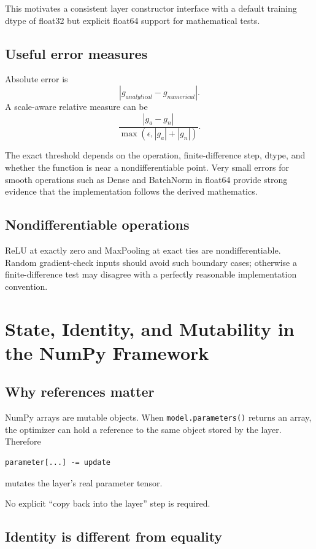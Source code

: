 \documentclass[11pt,a4paper]{article}
\newcommand{\code}[1]{\texttt{#1}}
\begin{document}
This motivates a consistent layer constructor interface with a default training dtype of float32 but explicit float64 support for mathematical tests.

\subsection{Useful error measures}

Absolute error is
\[
|g_{analytical}-g_{numerical}|.
\]
A scale-aware relative measure can be
\[
\frac{|g_a-g_n|}
{\max(\epsilon,|g_a|+|g_n|)}.
\]

The exact threshold depends on the operation, finite-difference step, dtype, and whether the function is near a nondifferentiable point. Very small errors for smooth operations such as Dense and BatchNorm in float64 provide strong evidence that the implementation follows the derived mathematics.

\subsection{Nondifferentiable operations}

ReLU at exactly zero and MaxPooling at exact ties are nondifferentiable. Random gradient-check inputs should avoid such boundary cases; otherwise a finite-difference test may disagree with a perfectly reasonable implementation convention.

\section{State, Identity, and Mutability in the NumPy Framework}

\subsection{Why references matter}

NumPy arrays are mutable objects. When \code{model.parameters()} returns an array, the optimizer can hold a reference to the same object stored by the layer. Therefore
\begin{lstlisting}
parameter[...] -= update
\end{lstlisting}
mutates the layer's real parameter tensor.

No explicit ``copy back into the layer'' step is required.

\subsection{Identity is different from equality}
\end{document}
